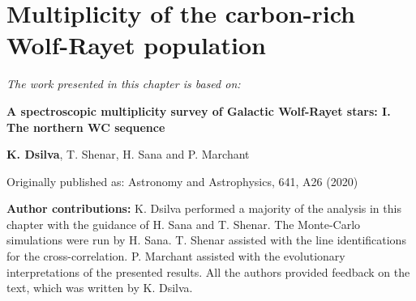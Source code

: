 \chapter{Multiplicity of the carbon-rich Wolf-Rayet population} \label{ch:wc}

\textit{The work presented in this chapter is based on:}

\textbf{A spectroscopic multiplicity survey of Galactic Wolf-Rayet stars: I. The northern WC sequence}

\textbf{K. Dsilva}, T. Shenar, H. Sana and P. Marchant

Originally published as: \newline
{\sc Astronomy and Astrophysics}, 641, A26 (2020)

\textbf{Author contributions:} K. Dsilva performed a majority of the analysis in this chapter with the guidance of H. Sana and T. Shenar. The Monte-Carlo simulations were run by H. Sana. T. Shenar assisted with the line identifications for the cross-correlation. P. Marchant assisted with the evolutionary interpretations of the presented results. All the authors provided feedback on the text, which was written by K. Dsilva.

